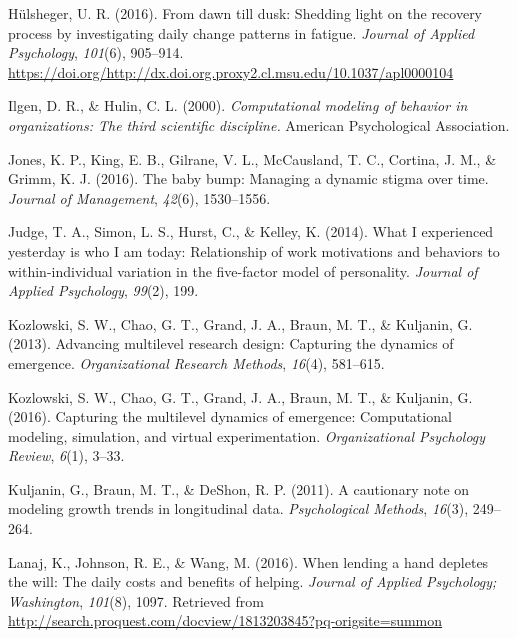 \documentclass[english,,man]{apa6}
\begin{document}
\leavevmode\hypertarget{ref-hulsheger_dawn_2016}{}%
Hülsheger, U. R. (2016). From dawn till dusk: Shedding light on the recovery process by investigating daily change patterns in fatigue. \emph{Journal of Applied Psychology}, \emph{101}(6), 905--914. \url{https://doi.org/http://dx.doi.org.proxy2.cl.msu.edu/10.1037/apl0000104}

\leavevmode\hypertarget{ref-ilgen_computational_2000}{}%
Ilgen, D. R., \& Hulin, C. L. (2000). \emph{Computational modeling of behavior in organizations: The third scientific discipline.} American Psychological Association.

\leavevmode\hypertarget{ref-jones_baby_2016}{}%
Jones, K. P., King, E. B., Gilrane, V. L., McCausland, T. C., Cortina, J. M., \& Grimm, K. J. (2016). The baby bump: Managing a dynamic stigma over time. \emph{Journal of Management}, \emph{42}(6), 1530--1556.

\leavevmode\hypertarget{ref-judge_what_2014}{}%
Judge, T. A., Simon, L. S., Hurst, C., \& Kelley, K. (2014). What I experienced yesterday is who I am today: Relationship of work motivations and behaviors to within-individual variation in the five-factor model of personality. \emph{Journal of Applied Psychology}, \emph{99}(2), 199.

\leavevmode\hypertarget{ref-kozlowski_advancing_2013}{}%
Kozlowski, S. W., Chao, G. T., Grand, J. A., Braun, M. T., \& Kuljanin, G. (2013). Advancing multilevel research design: Capturing the dynamics of emergence. \emph{Organizational Research Methods}, \emph{16}(4), 581--615.

\leavevmode\hypertarget{ref-kozlowski_capturing_2016}{}%
Kozlowski, S. W., Chao, G. T., Grand, J. A., Braun, M. T., \& Kuljanin, G. (2016). Capturing the multilevel dynamics of emergence: Computational modeling, simulation, and virtual experimentation. \emph{Organizational Psychology Review}, \emph{6}(1), 3--33.

\leavevmode\hypertarget{ref-kuljanin2011cautionary}{}%
Kuljanin, G., Braun, M. T., \& DeShon, R. P. (2011). A cautionary note on modeling growth trends in longitudinal data. \emph{Psychological Methods}, \emph{16}(3), 249--264.

\leavevmode\hypertarget{ref-lanaj_when_2016}{}%
Lanaj, K., Johnson, R. E., \& Wang, M. (2016). When lending a hand depletes the will: The daily costs and benefits of helping. \emph{Journal of Applied Psychology; Washington}, \emph{101}(8), 1097. Retrieved from \url{http://search.proquest.com/docview/1813203845?pq-origsite=summon}
\end{document}

